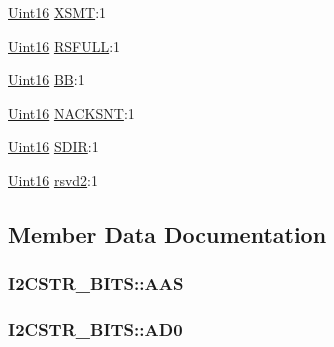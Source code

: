 \begin{DoxyCompactItemize}
\item 
\hyperlink{_d_s_p2833x___device_8h_a59a9f6be4562c327cbfb4f7e8e18f08b}{Uint16} \hyperlink{struct_i2_c_s_t_r___b_i_t_s_ae112827427b81bd35f8d180bd94f32c8}{X\+S\+M\+T}\+:1
\item 
\hyperlink{_d_s_p2833x___device_8h_a59a9f6be4562c327cbfb4f7e8e18f08b}{Uint16} \hyperlink{struct_i2_c_s_t_r___b_i_t_s_a5fe45f4da0221304ddc2d5b67d99702b}{R\+S\+F\+U\+L\+L}\+:1
\item 
\hyperlink{_d_s_p2833x___device_8h_a59a9f6be4562c327cbfb4f7e8e18f08b}{Uint16} \hyperlink{struct_i2_c_s_t_r___b_i_t_s_ac2d84bb7bb0281ca789620e5870f5926}{B\+B}\+:1
\item 
\hyperlink{_d_s_p2833x___device_8h_a59a9f6be4562c327cbfb4f7e8e18f08b}{Uint16} \hyperlink{struct_i2_c_s_t_r___b_i_t_s_ac5bd811bf405ffad7260b39967de5586}{N\+A\+C\+K\+S\+N\+T}\+:1
\item 
\hyperlink{_d_s_p2833x___device_8h_a59a9f6be4562c327cbfb4f7e8e18f08b}{Uint16} \hyperlink{struct_i2_c_s_t_r___b_i_t_s_add76c8dbfe1e8040a9d3222d45e2715e}{S\+D\+I\+R}\+:1
\item 
\hyperlink{_d_s_p2833x___device_8h_a59a9f6be4562c327cbfb4f7e8e18f08b}{Uint16} \hyperlink{struct_i2_c_s_t_r___b_i_t_s_a734c88025df18e7ce1051a13a9b18813}{rsvd2}\+:1
\end{DoxyCompactItemize}


\subsection{Member Data Documentation}
\hypertarget{struct_i2_c_s_t_r___b_i_t_s_a45b432d7da469e485e328c5040f40dda}{}
\subsubsection[{A\+A\+S}]{ I2\+C\+S\+T\+R\+\_\+\+B\+I\+T\+S\+::\+A\+A\+S}\label{struct_i2_c_s_t_r___b_i_t_s_a45b432d7da469e485e328c5040f40dda}
\hypertarget{struct_i2_c_s_t_r___b_i_t_s_a3a4dfae78c9e35d9ceac0daf32aaddae}{}
\subsubsection[{A\+D0}]{ I2\+C\+S\+T\+R\+\_\+\+B\+I\+T\+S\+::\+A\+D0}\label{struct_i2_c_s_t_r___b_i_t_s_a3a4dfae78c9e35d9ceac0daf32aaddae}
\hypertarget{struct_i2_c_s_t_r___b_i_t_s_a532ba17217d7a7cf772684c166582a58}{}

